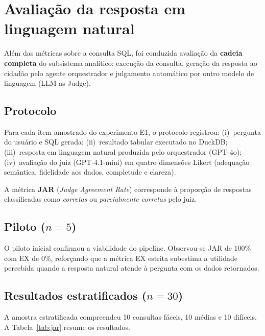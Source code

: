 \section{Avaliação da resposta em linguagem natural}

Além das métricas sobre a consulta SQL, foi conduzida avaliação da \textbf{cadeia completa} do subsistema analítico: execução da consulta, geração da resposta ao cidadão pelo agente orquestrador e julgamento automático por outro modelo de linguagem (LLM-as-Judge).

\subsection{Protocolo}

Para cada item amostrado do experimento E1, o protocolo registrou: (i)~pergunta do usuário e SQL gerada; (ii)~resultado tabular executado no DuckDB; (iii)~resposta em linguagem natural produzida pelo orquestrador (GPT-4o); (iv)~avaliação do juiz (GPT-4.1-mini) em quatro dimensões Likert (adequação semântica, fidelidade aos dados, completude e clareza).

A métrica \textbf{JAR} (\textit{Judge Agreement Rate}) corresponde à proporção de respostas classificadas como \textit{corretas} ou \textit{parcialmente corretas} pelo juiz.

\subsection{Piloto ($n=5$)}

O piloto inicial confirmou a viabilidade do pipeline. Observou-se JAR de 100\% com EX de 0\%, reforçando que a métrica EX estrita subestima a utilidade percebida quando a resposta natural atende à pergunta com os dados retornados.

\subsection{Resultados estratificados ($n=30$)}

A amostra estratificada compreendeu 10 consultas fáceis, 10 médias e 10 difíceis. A Tabela~\ref{tab:jar} resume os resultados.

